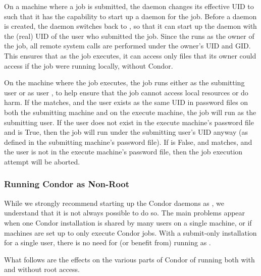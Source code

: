 On a machine where a job is submitted,
the  daemon
changes its effective UID to 
such that it has the capability to start up a  daemon
for the job.
Before a  daemon is created,
the  daemon
switches back to ,
so that it can start up the  daemon with the (real) UID
of the user who submitted the job.
Since the  runs as the owner of the job,
all remote system calls are performed under the owner's UID
and GID.
This ensures that as the job executes,
it can access only files that its owner could access if the job
were running locally, without Condor.

On the machine where the job executes, the 
job runs either as the submitting user or as user ,
to help ensure that the job cannot access local resources or do harm.  
If the  matches,
and the user exists as the same UID in password files
on both the submitting machine and on the execute machine,
the job will run as the submitting user.
If the user does not exist in the execute machine's
password file and  is True,
then the job will run under the submitting user's UID anyway (as
defined in the submitting machine's password file).
If  is False,
and  matches,
and the user is not in the execute machine's password file,
then the job execution attempt will be aborted.

\subsubsection{\label{sec:Non-Root}Running Condor as Non-Root}

While we strongly recommend starting up the Condor daemons as ,
we understand that it is not always possible to do so.
The main problems
appear when one Condor installation is shared by many users on a
single machine, or if machines are set up to only execute
Condor jobs.  With a submit-only installation for a
single user, there is no need for (or benefit from) running as
.

What follows are the effects on the various parts of Condor of running
both with and without root access.

